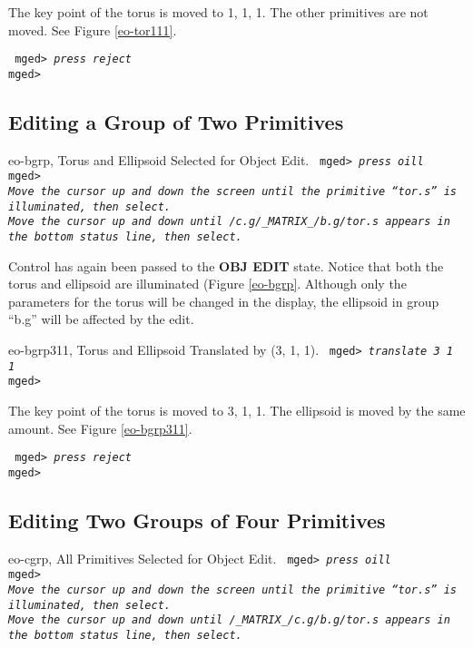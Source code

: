 The key point of the torus is moved to 1, 1, 1.  The other primitives are
not moved.  See Figure \ref{eo-tor111}.

\noindent
{\tt
mged> {\em press reject}\\
mged>\\
}

\subsection{Editing a Group of Two Primitives}

\mfig eo-bgrp, Torus and Ellipsoid Selected for Object Edit.
\noindent
{\tt
mged> {\em press oill}\\
mged>\\
{\em Move the cursor up and down the screen until the primitive ``tor.s''
is illuminated, then select.}\\
{\em Move the cursor up and down until {\tt /c.g/\_MATRIX\_/b.g/tor.s} appears
in the bottom status line, then select.}\\
}

Control has again been passed to the {\bf OBJ EDIT} state. Notice that
both the torus and ellipsoid are illuminated (Figure \ref{eo-bgrp}.
Although only the parameters for the torus will be changed in the
display, the ellipsoid in group ``b.g'' will be affected by the edit.

\mfig eo-bgrp311, Torus and Ellipsoid Translated by (3, 1, 1).
\noindent
{\tt
mged> {\em translate 3 1 1}\\
mged>\\
}

The key point of the torus is moved to 3, 1, 1. The ellipsoid is
moved by the same amount.  See Figure \ref{eo-bgrp311}.

\noindent
{\tt
mged> {\em press reject}\\
mged>\\
}

\subsection{Editing Two Groups of Four Primitives}

\mfig eo-cgrp, All Primitives Selected for Object Edit.
\noindent
{\tt
mged> {\em press oill}\\
mged>\\
{\em Move the cursor up and down the screen until the primitive ``tor.s''
is illuminated, then select.}\\
{\em Move the cursor up and down until {\tt /\_MATRIX\_/c.g/b.g/tor.s} appears
in the bottom status line, then select.}\\
}

